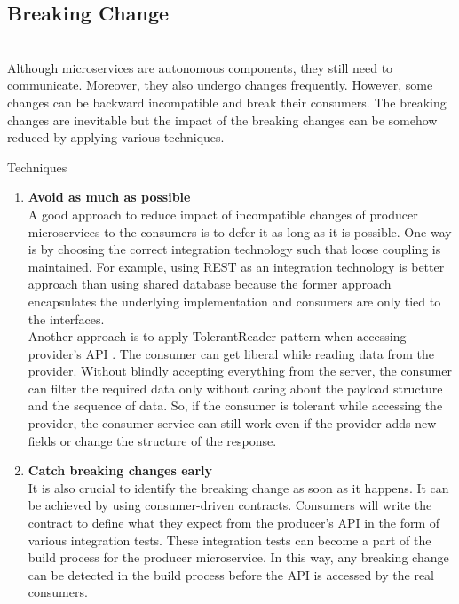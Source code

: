 \subsection{Breaking Change}\label{section:challanges_of_microservices_architecture/integration/breaking_change}
\\
Although microservices are autonomous components, they still need to communicate. Moreover, they also undergo changes frequently. However, some changes can be backward incompatible and break their consumers. The breaking changes are inevitable but the impact of the breaking changes can be somehow reduced by applying various techniques. \cite{Newman:2015aa}
\begin{shaded}Techniques\end{shaded}
\begin{enumerate}
\item \textbf{Avoid as much as possible} \\ A good approach to reduce impact of incompatible changes of producer microservices to the consumers is to defer it as long as it is possible. One way is by choosing the correct integration technology such that loose coupling is maintained. For example, using \acrshort{REST} as an integration technology is better approach than using shared database because the former approach encapsulates the underlying implementation and consumers are only tied to the interfaces.\\
Another approach is to apply TolerantReader pattern when accessing provider's \acrshort{API} \cite{Fowler:2011aa}.  The consumer can get liberal while reading data from the provider. Without blindly accepting everything from the server, the consumer can filter the required data only without caring about the payload structure and the sequence of data. So, if the consumer is tolerant while accessing the provider, the consumer service can still work even if the provider adds new fields or change the structure of the response.
\item \textbf{Catch breaking changes early} \\ It is also crucial to identify the breaking change as soon as it happens. It can be achieved by using consumer-driven contracts. Consumers will write the contract to define what they expect from the producer's \acrshort{API} in the form of various integration tests. These integration tests can become a part of the build process for the producer microservice. In this way, any breaking change can be detected in the build process before the \acrshort{API} is accessed by the real consumers.

\end{enumerate}
